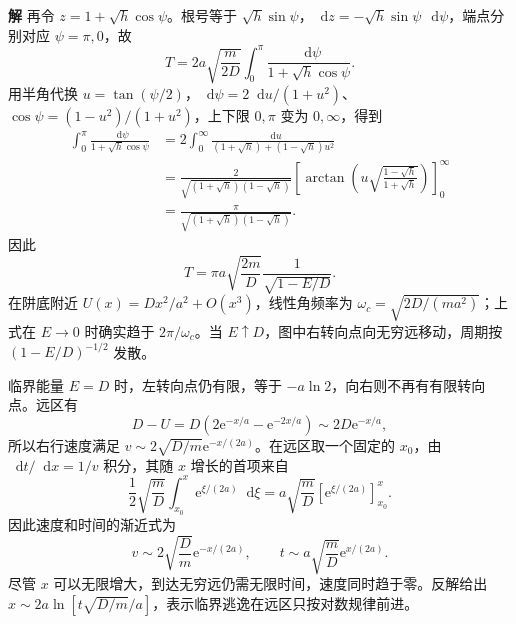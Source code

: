 \documentclass[11pt,openany,fontset=fandol]{ctexbook}
\theoremstyle{definition}\newtheorem{example}{例}[chapter]\newtheorem{exercise}{习题}[chapter]
\newcommand{\SolutionStart}{\par\medskip\ifdim\pagetotal>0pt\ifdim\dimexpr\pagegoal-\pagetotal\relax<3\baselineskip\newpage\fi\fi\noindent\textbf{解}\quad\ignorespaces}
\newenvironment{solution}{\SolutionStart}{\par\medskip}
\newcommand{\dd}{\mathop{}\!\mathrm d}\newcommand{\ee}{\mathrm e}\newcommand{\vct}[1]{\bm{#1}}
\begin{document}
\begin{solution}
再令 $z=1+\sqrt h\cos\psi$。根号等于 $\sqrt h\sin\psi$，$\dd z=-\sqrt h\sin\psi\,\dd\psi$，端点分别对应 $\psi=\pi,0$，故
\[
T=2a\sqrt{\frac m{2D}}\int_0^\pi
\frac{\dd\psi}{1+\sqrt h\cos\psi}.
\]
用半角代换 $u=\tan(\psi/2)$，$\dd\psi=2\dd u/(1+u^2)$、$\cos\psi=(1-u^2)/(1+u^2)$，上下限 $0,\pi$ 变为 $0,\infty$，得到
\begin{align*}
\int_0^\pi\frac{\dd\psi}{1+\sqrt h\cos\psi}
&=2\int_0^\infty\frac{\dd u}{(1+\sqrt h)+(1-\sqrt h)u^2}\\
&=\frac{2}{\sqrt{(1+\sqrt h)(1-\sqrt h)}}
\left[\arctan\left(u\sqrt{\frac{1-\sqrt h}{1+\sqrt h}}\right)\right]_0^\infty\\
&=\frac\pi{\sqrt{(1+\sqrt h)(1-\sqrt h)}}.
\end{align*}
因此
\[
T=\pi a\sqrt{\frac{2m}{D}}\frac1{\sqrt{1-E/D}}.
\]
在阱底附近 $U(x)=Dx^2/a^2+O(x^3)$，线性角频率为 $\omega_c=\sqrt{2D/(ma^2)}$；上式在 $E\to0$ 时确实趋于 $2\pi/\omega_c$。当 $E\uparrow D$，图中右转向点向无穷远移动，周期按 $(1-E/D)^{-1/2}$ 发散。

临界能量 $E=D$ 时，左转向点仍有限，等于 $-a\ln2$，向右则不再有有限转向点。远区有
\[
D-U=D\left(2\ee^{-x/a}-\ee^{-2x/a}\right)
\sim2D\ee^{-x/a},
\]
所以右行速度满足 $v\sim2\sqrt{D/m}\ee^{-x/(2a)}$。在远区取一个固定的 $x_0$，由 $\dd t/\dd x=1/v$ 积分，其随 $x$ 增长的首项来自
\[
\frac12\sqrt{\frac mD}\int_{x_0}^x\ee^{\xi/(2a)}\dd\xi
=a\sqrt{\frac mD}[\ee^{\xi/(2a)}]_{x_0}^x.
\]
因此速度和时间的渐近式为
\[
v\sim2\sqrt{\frac Dm}\ee^{-x/(2a)},\qquad
t\sim a\sqrt{\frac mD}\ee^{x/(2a)}.
\]
尽管 $x$ 可以无限增大，到达无穷远仍需无限时间，速度同时趋于零。反解给出 $x\sim2a\ln[t\sqrt{D/m}/a]$，表示临界逃逸在远区只按对数规律前进。
\end{solution}
\end{document}
